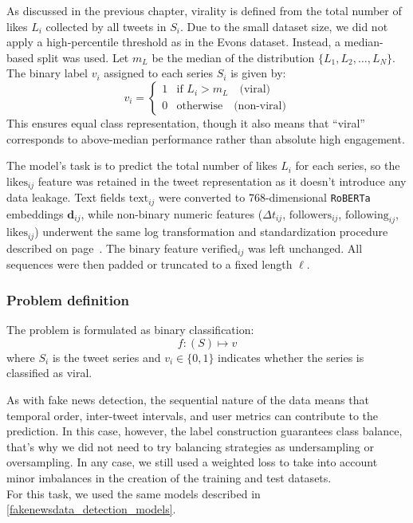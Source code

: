 \documentclass[a4paper,twoside,12pt]{book}
\begin{document}
As discussed in the previous chapter, virality is defined from the total number of likes $L_i$ collected by all tweets in $S_i$. Due to the small dataset size, we did not apply a high-percentile threshold as in the Evons dataset. Instead, a median-based split was used. Let $m_L$ be the median of the distribution $\{L_1, L_2, \dots, L_N\}$. The binary label $v_i$ assigned to each series $S_i$ is given by:
\[
v_i =
\begin{cases}
	1 & \text{if } L_i > m_L \quad \text{(viral)} \\
	0 & \text{otherwise} \quad \text{(non-viral)}
\end{cases}
\]
This ensures equal class representation, though it also means that ``viral'' corresponds to above-median performance rather than absolute high engagement.

The model's task is to predict the total number of likes $L_i$ for each series, so the $\text{likes}_{ij}$ feature was retained in the tweet representation as it doesn't introduce any data leakage. Text fields $\text{text}_{ij}$ were converted to 768-dimensional \texttt{RoBERTa} embeddings $\mathbf{d}_{ij}$, while non-binary numeric features ($\Delta t_{ij}$, $\text{followers}_{ij}$, $\text{following}_{ij}$, $\text{likes}_{ij}$) underwent the same log transformation and standardization procedure described on page~\pageref{model 3}. The binary feature $\text{verified}_{ij}$ was left unchanged. All sequences were then padded or truncated to a fixed length $\ell$.

\subsubsection*{Problem definition}

The problem is formulated as binary classification:
\[
f: (S) \mapsto v
\]
where $S_i$ is the tweet series and $v_i \in \{0,1\}$ indicates whether the series is classified as viral.

As with fake news detection, the sequential nature of the data means that temporal order, inter-tweet intervals, and user metrics can contribute to the prediction. In this case, however, the label construction guarantees class balance, that's why we did not need to try balancing strategies as undersampling or oversampling. In any case, we still used a weighted loss to take into account minor imbalances in the creation of the training and test datasets.\\ For this task, we used the same models described in \ref{fakenewsdata_detection_models}.
\end{document}
